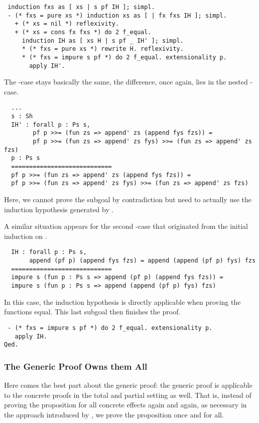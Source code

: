 \begin{verbatim}
 induction fxs as [ xs | s pf IH ]; simpl.
 - (* fxs = pure xs *) induction xs as [ | fx fxs IH ]; simpl.
   + (* xs = nil *) reflexivity.
   + (* xs = cons fx fxs *) do 2 f_equal.
     induction IH as [ xs H | s pf _ IH' ]; simpl.
     * (* fxs = pure xs *) rewrite H. reflexivity.
     * (* fxs = impure s pf *) do 2 f_equal. extensionality p.
       apply IH'.
\end{verbatim}

The -case stays basically the same, the difference, once again, lies in the nested -case.

\begin{verbatim}
  ...
  s : Sh
  IH' : forall p : Ps s,
        pf p >>= (fun zs => append' zs (append fys fzs)) =
        pf p >>= (fun zs => append' zs fys) >>= (fun zs => append' zs fzs)
  p : Ps s
  ============================
  pf p >>= (fun zs => append' zs (append fys fzs)) =
  pf p >>= (fun zs => append' zs fys) >>= (fun zs => append' zs fzs)
\end{verbatim}

Here, we cannot prove the subgoal by contradiction but need to actually use the induction hypothesis  generated by .

A similar situation appears for the second -case that originated from the initial induction on .
\begin{verbatim}
  IH : forall p : Ps s,
       append (pf p) (append fys fzs) = append (append (pf p) fys) fzs
  ============================
  impure s (fun p : Ps s => append (pf p) (append fys fzs)) =
  impure s (fun p : Ps s => append (append (pf p) fys) fzs)
\end{verbatim}

In this case, the induction hypothesis is directly applicable when proving the functions equal.
This last subgoal then finishes the proof.

\begin{verbatim}
 - (* fxs = impure s pf *) do 2 f_equal. extensionality p.
   apply IH.
Qed.
\end{verbatim}

\subsubsection{The Generic Proof Owns them All}

Here comes the best part about the generic proof: the generic proof is applicable to the concrete proofs in the total and partial setting as well.
That is, instead of proving the proposition for all concrete effects again and again, as necessary in the approach introduced by \citet{abel2005verifying}, we prove the proposition once and for all.

